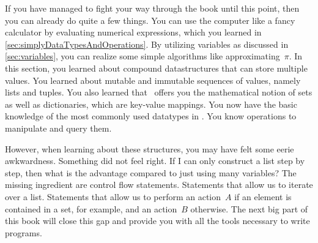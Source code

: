 %
%
If you have managed to fight your way through the book until this point, then you can already do quite a few things.
You can use the computer like a fancy calculator by evaluating numerical expressions, which you learned in
\cref{sec:simplyDataTypesAndOperations}.
By utilizing variables as discussed in \cref{sec:variables}, you can realize some simple algorithms like approximating~$\pi$.
In this section, you learned about compound datastructures that can store multiple values.
You learned about mutable and immutable sequences of values, namely lists and tuples.
You also learned that \python\ offers you the mathematical notion of sets as well as dictionaries, which are key-value mappings.
You now have the basic knowledge of the most commonly used datatypes in \python.
You know operations to manipulate and query them.

However, when learning about these structures, you may have felt some eerie awkwardness.
Something did not feel right.
If I can only construct a list step by step, then what is the advantage compared to just using many variables?
The missing ingredient are control flow statements.
Statements that allow us to iterate over a list.
Statements that allow us to perform an action~$A$ if an element is contained in a set, for example, and an action~$B$ otherwise.
The next big part of this book will close this gap and provide you with all the tools necessary to write  programs.%
%
\endhsection%
%
